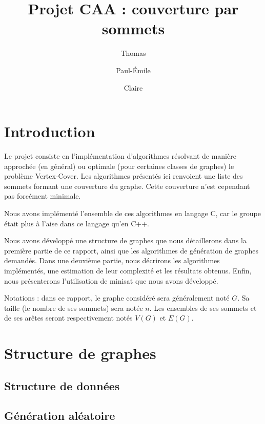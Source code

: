 \documentclass[a4paper,10pt]{article}
\title{Projet CAA : couverture par sommets}
\author{Thomas \bsc{Bellitto}\and Paul-Émile \bsc{Boutoille} \and Claire \bsc{Pennarun}}
\date{}
\begin{document}
\maketitle

\section*{Introduction}

Le projet consiste en l'implémentation d'algorithmes résolvant de manière approchée (en général) ou optimale (pour certaines classes de graphes) le problème Vertex-Cover.
Les algorithmes présentés ici renvoient une liste des sommets formant une couverture du graphe. Cette couverture n'est cependant pas forcément minimale.

Nous avons implémenté l'ensemble de ces algorithmes en langage C, car le groupe était plus à l'aise dans ce langage qu'en C++.

Nous avons développé une structure de graphes que nous détaillerons dans la première partie de ce rapport, ainsi que les algorithmes de génération de graphes demandés.
Dans une deuxième partie, nous décrirons les algorithmes implémentés, une estimation de leur complexité et les résultats obtenus.
Enfin, nous présenterons l'utilisation de minisat que nous avons développé.

Notations : dans ce rapport, le graphe considéré sera généralement noté $G$. Sa taille (le nombre de ses sommets) sera notée $n$. Les ensembles de ses sommets et de ses arêtes seront respectivement notés $V(G)$ et $E(G)$.

\section{Structure de graphes}

\subsection{Structure de données}


\subsection{Génération aléatoire}

\end{document}

